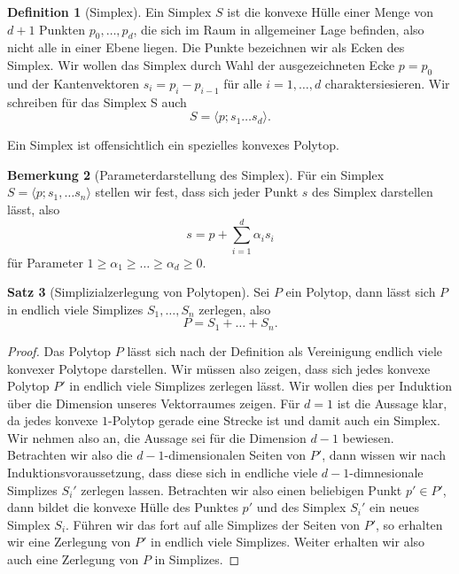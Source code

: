 \documentclass[11pt,titlepage]{article}
\theoremstyle{definition}
\newtheorem{theorem}{Satz}[section]
\newtheorem{definition}[theorem]{Definition}
\newtheorem{remark}[theorem]{Bemerkung}
\theoremstyle{remark}
\begin{document}
	\begin{definition}[Simplex]\label{def:simplex}
		Ein Simplex $S$ ist die konvexe Hülle einer Menge von $d+1$ Punkten 
		$p_0,\ldots,p_d$, die sich im Raum in allgemeiner Lage befinden, also 
		nicht alle in einer Ebene liegen. Die Punkte bezeichnen wir als 
		Ecken des Simplex. Wir wollen das Simplex durch Wahl der 
		ausgezeichneten Ecke $p=p_0$ und der Kantenvektoren 
		$s_i=p_i -p_{i-1}$ für alle $i=1,\ldots,d$ charaktersiesieren. 
		Wir schreiben für das Simplex S auch
		\[S=\langle p;s_1\ldots s_d\rangle.\]
	\end{definition}
	
	Ein Simplex ist offensichtlich ein spezielles konvexes Polytop. 
	
	\begin{remark}[Parameterdarstellung des Simplex]\label{bem:paradarst;simplex}
		Für ein Simplex $S=\langle p;s_1,\ldots s_n\rangle$ stellen wir 
		fest, dass sich jeder Punkt $s$ des Simplex darstellen lässt, also 
		\[s=p+\sum_{i=1}^d \alpha_i s_i\]
		für Parameter $1\geq \alpha_1\geq\ldots\geq\alpha_d\geq 0$. 
	\end{remark}
	
	\begin{theorem}[Simplizialzerlegung von Polytopen]\label{thm:simplzerl}
		Sei $P$ ein Polytop, dann lässt sich $P$ in endlich viele 
		Simplizes $S_1,\ldots,S_n$ zerlegen, also
		\[P=S_1+\ldots+S_n.\]
	\end{theorem}
	
	\begin{proof}
		Das Polytop $P$ lässt sich nach der Definition als Vereinigung endlich 
		viele konvexer Polytope darstellen. Wir müssen also 
		zeigen, dass sich jedes konvexe Polytop $P'$ in endlich viele Simplizes 
		zerlegen lässt. Wir wollen dies per Induktion über die Dimension 
		unseres Vektorraumes zeigen. Für $d=1$ ist die Aussage klar, da 
		jedes konvexe $1$-Polytop gerade eine Strecke ist und damit auch ein 
		Simplex. Wir nehmen also an, die Aussage sei für die Dimension $d-1$ 
		bewiesen. Betrachten wir also die $d-1$-dimensionalen Seiten von 
		$P'$, dann wissen wir nach Induktionsvoraussetzung, dass diese 
		sich in endliche viele $d-1$-dimnesionale Simplizes $S_i'$ zerlegen lassen. 
		Betrachten wir also einen beliebigen Punkt $p'\in P'$, dann 
		bildet die konvexe Hülle des Punktes $p'$ und des Simplex $S_i'$ ein 
		neues Simplex $S_i$. Führen wir das fort auf alle Simplizes der Seiten 
		von $P'$, so erhalten wir eine Zerlegung von $P'$ in endlich viele 
		Simplizes. Weiter erhalten wir also auch eine Zerlegung von 
		$P$ in Simplizes.
	\end{proof}
	
\end{document}

